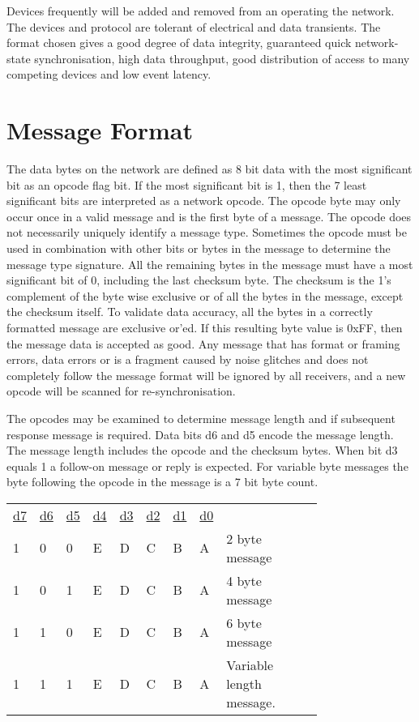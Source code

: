 Devices frequently will be added and removed from an operating the network. The devices and protocol are tolerant of electrical and data transients. The format chosen gives a good degree of data integrity, guaranteed quick network-state synchronisation, high data throughput, good distribution of access to many competing devices and low event latency. 

\section{Message Format}

The data bytes on the network are defined as 8 bit data with the most significant bit as an \gls{opcode} flag bit. If the most significant bit is 1, then the 7 least significant bits are interpreted as a network opcode. The opcode byte may only occur once in a valid message and is the first byte of a message. The opcode does not necessarily uniquely identify a message type. Sometimes the opcode must be used in combination with other bits or bytes in the message to determine the message type signature. All the remaining bytes in the message must have a most significant bit of 0, including the last checksum byte. The checksum is the 1's complement of the byte wise exclusive or of all the bytes in the message, except the checksum itself. To validate data accuracy, all the bytes in a correctly formatted message are exclusive or'ed. If this resulting byte value is 0xFF, then the message data is accepted as good. Any message that has format or framing errors, data errors or is a fragment caused by noise glitches and does not completely follow the message format will be ignored by all receivers, and a new opcode will be scanned for re-synchronisation.

The opcodes may be examined to determine message length and if subsequent response message is required. Data bits d6 and d5 encode the message length. The message length includes the opcode and the checksum bytes. When bit d3 equals 1 a follow-on message or reply is expected. For variable byte messages the byte following the opcode in the message is a 7 bit byte count.

\begin{tabular}{p{0.05\linewidth} p{0.05\linewidth}  p{0.05\linewidth}  p{0.05\linewidth}  p{0.05\linewidth}  p{0.05\linewidth}  p{0.05\linewidth}  p{0.05\linewidth} p{0.36\linewidth}} 
\underline{d7} & \underline{d6} & \underline{d5} & \underline{d4} & \underline{d3} & \underline{d2} & \underline{d1} & \underline{d0} & \\
1 & 0 & 0 & E & D & C & B & A & 2 byte message\\
1 & 0 & 1 & E & D & C & B & A & 4 byte message\\
1 & 1 & 0 & E & D & C & B & A & 6 byte message\\
1 & 1 & 1 & E & D & C & B & A & Variable length message.\\
\end{tabular}

